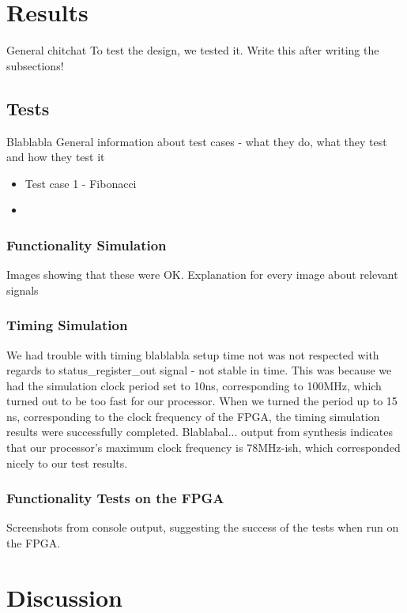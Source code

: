 \documentclass[11pt]{article}
\begin{document}
\section{Results}
\label{sec:results} General chitchat To test the design, we tested
it. Write this after writing the subsections!

\subsection{Tests}
\label{subsec:tests}

Blablabla General information about test cases - what they do, what
they test and how they test it

\begin{itemize}
\item Test case 1 - Fibonacci
\item 
\end{itemize}

\subsubsection{Functionality Simulation}
\label{subsubsec:funcsim} Images showing that these were
OK. Explanation for every image about relevant signals

\subsubsection{Timing Simulation}
\label{subsubsec:timingsim}

We had trouble with timing blablabla setup time not was not respected
with regards to status\_register\_out signal - not stable in time. This
was because we had the simulation clock period set to 10ns,
corresponding to 100MHz, which turned out to be too fast for our
processor. When we turned the period up to 15 ns, corresponding to the
clock frequency of the FPGA, the timing simulation results were
successfully completed. Blablabal... output from synthesis indicates
that our processor's maximum clock frequency is 78MHz-ish, which
corresponded nicely to our test results.

\subsubsection{Functionality Tests on the FPGA}
\label{subsec:funcfpga} Screenshots from console output, suggesting
the success of the tests when run on the FPGA.

\section{Discussion}
\label{sec:discussion}
\end{document}
